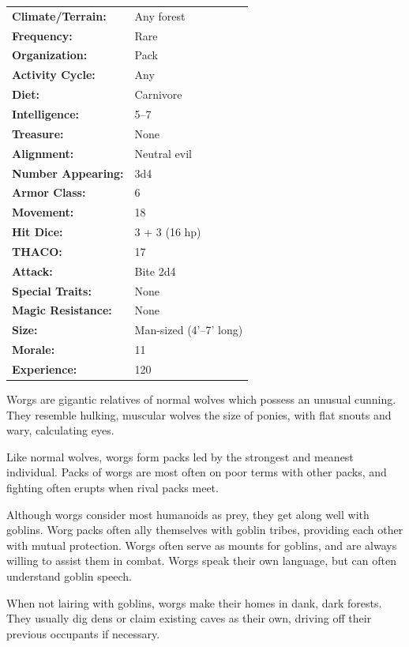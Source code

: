 \begin{multicols}{2}
\begin{minipage}{\columnwidth}
\noindent \begin{tabular}{p{}p{}}
\textbf{Climate/Terrain:}	& Any forest	\\
\textbf{Frequency:} 		& Rare	\\
\textbf{Organization:} 		& Pack	\\
\textbf{Activity Cycle:} 	& Any	\\
\textbf{Diet:} 				& Carnivore	\\
\textbf{Intelligence:} 		& 5--7	\\
\textbf{Treasure:} 			& None	\\
\textbf{Alignment:} 		& Neutral evil	\\
\hline
\textbf{Number Appearing:} 	& 3d4	\\
\textbf{Armor Class:} 		& 6	\\
\textbf{Movement:} 			& 18	\\
\textbf{Hit Dice:} 			& 3 + 3 (16 hp)	\\
\textbf{THACO:} 			& 17	\\
\textbf{Attack:} 			& Bite 2d4	\\
\textbf{Special Traits:} & None	\\
\textbf{Magic Resistance:} 	& None	\\
\textbf{Size:} 				& Man-sized (4'--7' long)	\\
\textbf{Morale:} 			& 11	\\
\textbf{Experience:} 		& 120	\\
\end{tabular}

\end{minipage}

Worgs are gigantic relatives of normal wolves which possess an unusual cunning. They resemble hulking, muscular wolves the size of ponies, with flat snouts and wary, calculating eyes.

Like normal wolves, worgs form packs led by the strongest and meanest individual. Packs of worgs are most often on poor terms with other packs, and fighting often erupts when rival packs meet.

Although worgs consider most humanoids as prey, they get along well with goblins. Worg packs often ally themselves with goblin tribes, providing each other with mutual protection. Worgs often serve as mounts for goblins, and are always willing to assist them in combat. Worgs speak their own language, but can often understand goblin speech.

When not lairing with goblins, worgs make their homes in dank, dark forests. They usually dig dens or claim existing caves as their own, driving off their previous occupants if necessary.


\end{multicols}
